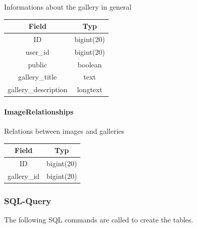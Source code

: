\documentclass[a4paper,12pt,oneside]{article} %
\begin{document}
Informations about the gallery in general


\begin{tabular}{|c|c|}
\hline
Field & Typ\tabularnewline
\hline
\hline
ID & bigint(20)\tabularnewline
\hline
user\_id & bigint(20)\tabularnewline
\hline
public & boolean\tabularnewline
\hline
gallery\_title & text\tabularnewline
\hline
gallery\_description & longtext\tabularnewline
\end{tabular}


\paragraph*{ImageRelationships}

Relations between images and galleries


\begin{tabular}{|c|c|}
\hline
Field & Typ\tabularnewline
\hline
\hline
ID & bigint(20)\tabularnewline
\hline
gallery\_id & bigint(20)\tabularnewline
\end{tabular}



\subsubsection{SQL-Query}

The following SQL commands are called to create the tables.
\end{document}
